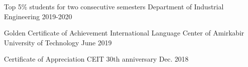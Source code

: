 

\begin{cvhonors}

  \cvhonor
    {Top 5\% students for two consecutive semesters} %
    {Department of Industrial Engineering} %
    {} %
    {2019-2020} %


  \cvhonor
    {Golden Certificate of Achievement} %
    {International Language Center of Amirkabir University of Technology} %
    {} %
    {June 2019} %

  \cvhonor
    {Certificate of Appreciation} %
    {CEIT 30th anniversary} %
    {} %
    {Dec. 2018} %

\end{cvhonors}